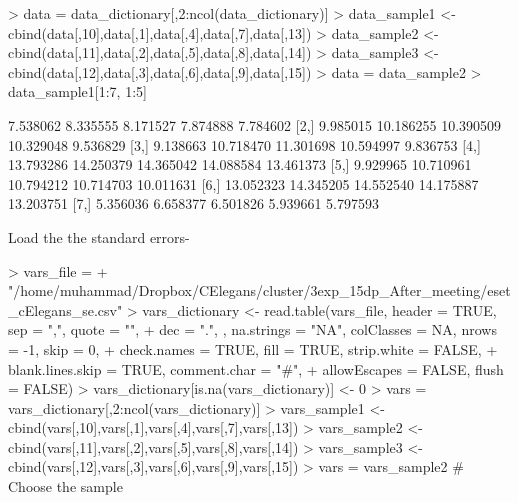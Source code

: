 \documentclass{article}
\begin{document}
\begin{Schunk}
\begin{Sinput}
> data = data_dictionary[,2:ncol(data_dictionary)]
> data_sample1 <- cbind(data[,10],data[,1],data[,4],data[,7],data[,13])
> data_sample2 <- cbind(data[,11],data[,2],data[,5],data[,8],data[,14])
> data_sample3 <- cbind(data[,12],data[,3],data[,6],data[,9],data[,15])
> data = data_sample2
> data_sample1[1:7, 1:5]
\end{Sinput}
\begin{Soutput}
          [,1]      [,2]      [,3]      [,4]      [,5]
[1,]  7.538062  8.335555  8.171527  7.874888  7.784602
[2,]  9.985015 10.186255 10.390509 10.329048  9.536829
[3,]  9.138663 10.718470 11.301698 10.594997  9.836753
[4,] 13.793286 14.250379 14.365042 14.088584 13.461373
[5,]  9.929965 10.710961 10.794212 10.714703 10.011631
[6,] 13.052323 14.345205 14.552540 14.175887 13.203751
[7,]  5.356036  6.658377  6.501826  5.939661  5.797593
\end{Soutput}
\end{Schunk}

Load the the standard errors-

\begin{Schunk}
\begin{Sinput}
> vars_file = 
+   "/home/muhammad/Dropbox/CElegans/cluster/3exp_15dp_After_meeting/eset_cElegans_se.csv"
> vars_dictionary <- read.table(vars_file, header = TRUE, sep = ",", quote = "", 
+                   dec = ".", , na.strings = "NA", colClasses = NA, nrows = -1, skip = 0, 
+                   check.names = TRUE, fill = TRUE, strip.white = FALSE, 
+                   blank.lines.skip = TRUE, comment.char = "#", 
+                   allowEscapes = FALSE, flush = FALSE)
> vars_dictionary[is.na(vars_dictionary)] <- 0
> vars = vars_dictionary[,2:ncol(vars_dictionary)]
> vars_sample1 <- cbind(vars[,10],vars[,1],vars[,4],vars[,7],vars[,13])
> vars_sample2 <- cbind(vars[,11],vars[,2],vars[,5],vars[,8],vars[,14])
> vars_sample3 <- cbind(vars[,12],vars[,3],vars[,6],vars[,9],vars[,15])
> vars = vars_sample2 # Choose the sample
\end{Sinput}
\end{Schunk}
\end{document}

